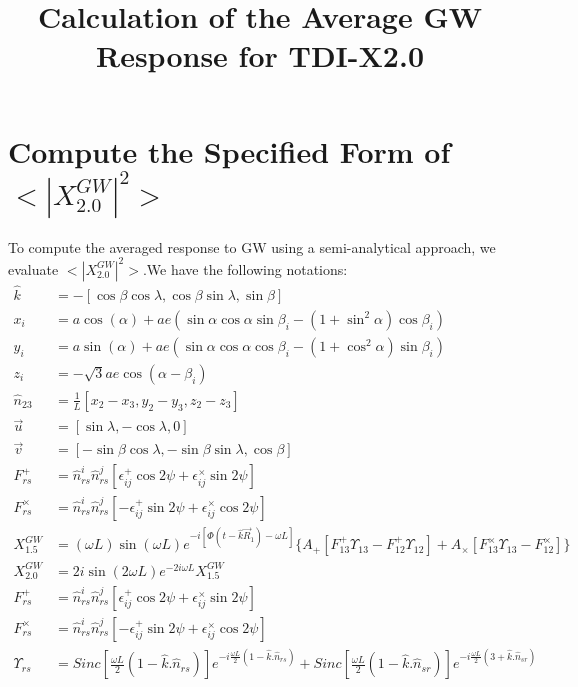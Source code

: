 \documentclass{article}
\title{\textbf{Calculation of the Average GW Response for TDI-X2.0 }}
\begin{document}
	\maketitle
	\tableofcontents
	\section{Compute the Specified Form of $<\left| X^{GW}_{2.0} \right|^2>$}
	To compute the averaged response to GW using a semi-analytical approach, we evaluate $<\left| X^{GW}_{2.0} \right|^2>$.We have the following notations:
	\begin{align}
		\hat{k} &= -[\cos \beta \cos \lambda , \cos \beta \sin \lambda, \sin \beta] \\
		x_i &= a \cos(\alpha) + ae(\sin \alpha \cos \alpha \sin\beta_i - (1 + \sin^2 \alpha )\cos \beta_i) \\
		y_i &= a \sin(\alpha) + ae(\sin \alpha \cos \alpha \cos\beta_i - (1 + \cos^2 \alpha) \sin \beta_i) \\
		z_i &= -\sqrt{3}ae\cos (\alpha - \beta_i) \\
		\hat{n}_{23} &= \frac{1}{L}[x_2 - x_3 , y_2 - y_3 , z_2 - z_3 ] \\
		\label{u}
		\vec{u} &= [\sin \lambda , -\cos \lambda , 0] \\
		\label{v}
		\vec{v} &= [- \sin \beta \cos \lambda , -\sin \beta \sin \lambda , \cos \beta] \\
		\label{F+}
		F^{+}_{rs} &= \hat{n}^i_{rs} \hat{n}^j_{rs} [\epsilon^{+}_{ij} \cos 2 \psi + \epsilon^{\times}_{ij} \sin 2 \psi ] \\
		\label{Fx}
		F^{\times}_{rs} &= \hat{n}^i_{rs} \hat{n}^j_{rs} [-\epsilon^{+}_{ij} \sin 2 \psi + \epsilon^{\times}_{ij} \cos 2 \psi ] \\
			X^{GW}_{1.5} &= (\omega L) \sin(\omega L) e^{-i[\Phi(t-\hat{k}\vec{R}_1)-\omega L]} \{A_+ [F^{+}_{13} \Upsilon_{13} - F^{+}_{12} \Upsilon_{12}] + A_{\times} [F^{\times}_{13} \Upsilon_{13} - F^{\times}_{12}]\} \\
			\label{2.0}
		X^{GW}_{2.0} &= 2i \sin(2\omega L) e^{-2i\omega L} X^{GW}_{1.5} \\
		F^{+}_{rs} &= \hat{n}^i_{rs} \hat{n}^j_{rs} [\epsilon^{+}_{ij} \cos 2 \psi + \epsilon^{\times}_{ij} \sin 2 \psi ] \\
		F^{\times}_{rs} &= \hat{n}^i_{rs} \hat{n}^j_{rs} [-\epsilon^{+}_{ij} \sin 2 \psi + \epsilon^{\times}_{ij} \cos 2 \psi ] \\
		\Upsilon_{rs} &= Sinc[\frac{\omega L}{2}(1-\hat{k}.\hat{n}_{rs})]e^{-i\frac{\omega L}{2}(1-\hat{k}.\hat{n}_{rs})} + Sinc[\frac{\omega L}{2}(1-\hat{k}.\hat{n}_{sr})]e^{-i\frac{\omega L}{2}(3+\hat{k}.\hat{n}_{sr})} 
	\end{align}
	
\end{document}
